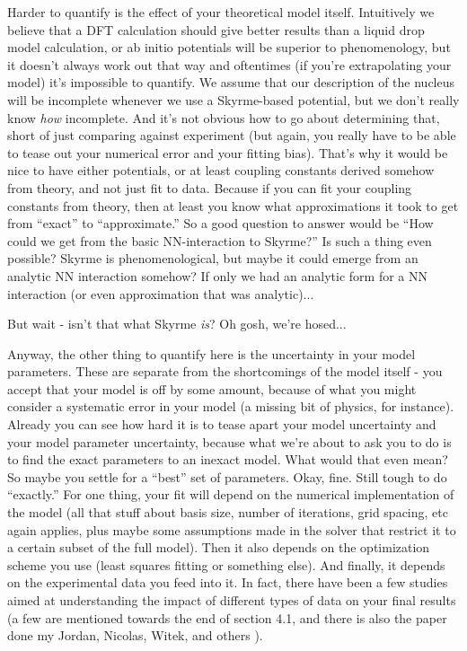 Harder to quantify is the effect of your theoretical model itself. Intuitively we believe that a DFT calculation should give better results than a liquid drop model calculation, or ab initio potentials will be superior to phenomenology, but it doesn't always work out that way and oftentimes (if you're extrapolating your model) it's impossible to quantify. We assume that our description of the nucleus will be incomplete whenever we use a Skyrme-based potential, but we don't really know \textit{how} incomplete. And it's not obvious how to go about determining that, short of just comparing against experiment (but again, you really have to be able to tease out your numerical error and your fitting bias). That's why it would be nice to have either potentials, or at least coupling constants derived somehow from theory, and not just fit to data. Because if you can fit your coupling constants from theory, then at least you know what approximations it took to get from ``exact'' to ``approximate.'' So a good question to answer would be ``How could we get from the basic NN-interaction to Skyrme?'' Is such a thing even possible? Skyrme is phenomenological, but maybe it could emerge from an analytic NN interaction somehow? If only we had an analytic form for a NN interaction (or even approximation that was analytic)...

But wait - isn't that what Skyrme \textit{is}? Oh gosh, we're hosed...

Anyway, the other thing to quantify here is the uncertainty in your model parameters. These are separate from the shortcomings of the model itself - you accept that your model is off by some amount, because of what you might consider a systematic error in your model (a missing bit of physics, for instance). Already you can see how hard it is to tease apart your model uncertainty and your model parameter uncertainty, because what we're about to ask you to do is to find the exact parameters to an inexact model. What would that even mean? So maybe you settle for a ``best'' set of parameters. Okay, fine. Still tough to do ``exactly.'' For one thing, your fit will depend on the numerical implementation of the model (all that stuff about basis size, number of iterations, grid spacing, etc again applies, plus maybe some assumptions made in the solver that restrict it to a certain subset of the full model). Then it also depends on the optimization scheme you use (least squares fitting or something else). And finally, it depends on the experimental data you feed into it. In fact, there have been a few studies aimed at understanding the impact of different types of data on your final results (a few are mentioned towards the end of section 4.1, and there is also the paper done my Jordan, Nicolas, Witek, and others \cite{McDonnell2015}).


